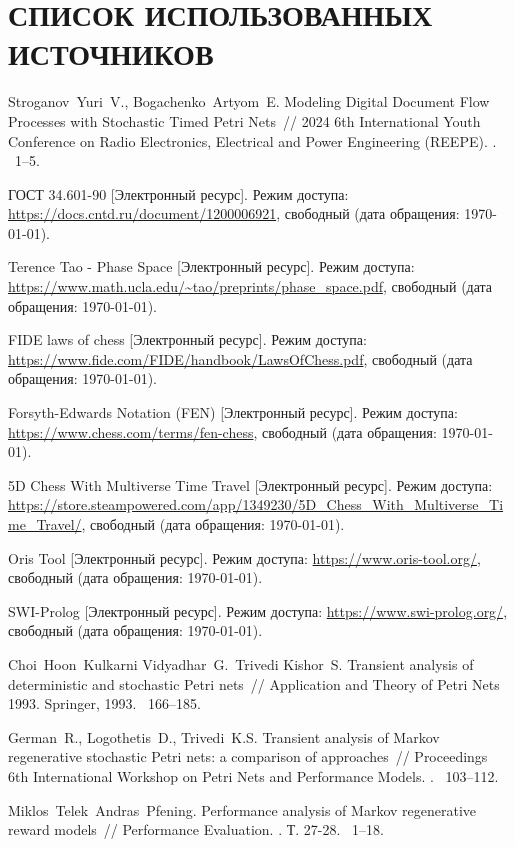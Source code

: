 \section*{СПИСОК ИСПОЛЬЗОВАННЫХ ИСТОЧНИКОВ}

\begingroup
\renewcommand{\section}[2]{}
\begin{thebibliography}{}
	Stroganov~Yuri~V., Bogachenko~Artyom~E. Modeling Digital Document Flow
	Processes with Stochastic Timed Petri Nets~// 2024 6th International Youth
	Conference on Radio Electronics, Electrical and Power Engineering (REEPE).
	.
	~1--5.
	
	ГОСТ 34.601-90 [Электронный ресурс].
	\newblock Режим доступа:
	\url{https://docs.cntd.ru/document/1200006921}, свободный (дата
	обращения: \today).
	
	Terence Tao - Phase Space [Электронный ресурс].
	\newblock Режим доступа:
	\url{https://www.math.ucla.edu/~tao/preprints/phase_space.pdf},
	свободный (дата обращения: \today).
	
	FIDE laws of chess [Электронный ресурс].
	\newblock Режим доступа:
	\url{https://www.fide.com/FIDE/handbook/LawsOfChess.pdf}, свободный
	(дата обращения: \today).
	
	Forsyth-Edwards Notation (FEN) [Электронный ресурс].
	\newblock Режим доступа:
	\url{https://www.chess.com/terms/fen-chess}, свободный (дата
	обращения: \today).
	
	5D Chess With Multiverse Time Travel [Электронный ресурс].
	\newblock Режим доступа:
	\url{https://store.steampowered.com/app/1349230/5D_Chess_With_Multiverse_Time_Travel/},
	свободный (дата обращения: \today).
	
	Oris Tool [Электронный ресурс].
	\newblock Режим доступа: \url{https://www.oris-tool.org/},
	свободный (дата обращения: \today).
	
	SWI-Prolog [Электронный ресурс].
	\newblock Режим доступа: \url{https://www.swi-prolog.org/},
	свободный (дата обращения: \today).
	
	Choi~Hoon~Kulkarni Vidyadhar~G.~Trivedi Kishor~S. Transient analysis of
	deterministic and stochastic Petri nets~// Application and Theory of Petri
	Nets 1993.
	\newblock Springer, 1993.
	~166--185.
	
	German~R., Logothetis~D., Trivedi~K.S. Transient analysis of Markov
	regenerative stochastic Petri nets: a comparison of approaches~// Proceedings
	6th International Workshop on Petri Nets and Performance Models.
	.
	~103--112.
	
	Miklos~Telek~Andras~Pfening. Performance analysis of Markov regenerative reward
	models~// Performance Evaluation.
	.
	\newblock Т. 27-28.
	~1--18.
	
\end{thebibliography}
\endgroup
